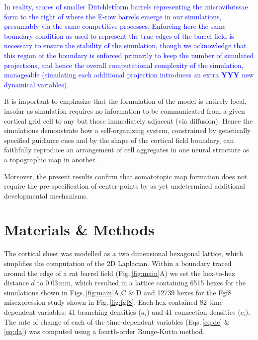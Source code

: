 \documentclass[9pt,lineno]{elife}
\newcommand{\cmnt}[1]{\textcolor{blue}{#1}}
\begin{document}
\cmnt{In reality, scores of smaller Dirichletform barrels representing the
  microvibrissae form to the right of where the E-row barrels emerge in our
  simulations, presumably via the same competitive processes. Enforcing here
  the same boundary condition as used to represent the true edges of the
  barrel field is necessary to ensure the stability of the simulation, though
  we acknowledge that this region of the boundary is enforced primarily to
  keep the number of simulated projections, and hence the overall
  computational complexity of the simulation, manageable (simulating each
  additional projection introduces an extra \textbf{YYY} new dynamical
  variables).}

It is important to emphasize that the formulation of the model is entirely
local, insofar as simulation requires no information to be communicated from a
given cortical grid cell to any but those immediately adjacent (via
diffusion). Hence the simulations demonstrate how a self-organizing system,
constrained by genetically specified guidance cues and by the shape of the
cortical field boundary, can faithfully reproduce an arrangement of cell
aggregates in one neural structure as a topographic map in another.

Moreover, the present results confirm that somatotopic map formation does not
require the pre-specification of center-points by as yet undetermined
additional developmental mechanisms.

\section{Materials \& Methods}

%
%

The cortical sheet was modelled as a two dimensional hexagonal lattice, which
simplifies the computation of the 2D Laplacian. Within a boundary traced
around the edge of a
rat barrel field (Fig.\,\ref{fig:main}A) we set the hex-to-hex distance
$d$ to 0.03\,mm, which resulted in a lattice containing 6515 hexes for the
simulations shown in Figs.\,\ref{fig:main}A,C \& D and 12739 hexes for the Fgf8
misexpression study shown in Fig.\,\ref{fig:fgf8}. Each hex contained 82 time-dependent
variables: 41 branching densities ($a_i$) and 41 connection densities ($c_i$).
The rate of change of each of the time-dependent variables (Eqs.\,\ref{eq:dc}
\& \ref{eq:da}) was computed using a fourth-order Runge-Kutta method.
\end{document}
